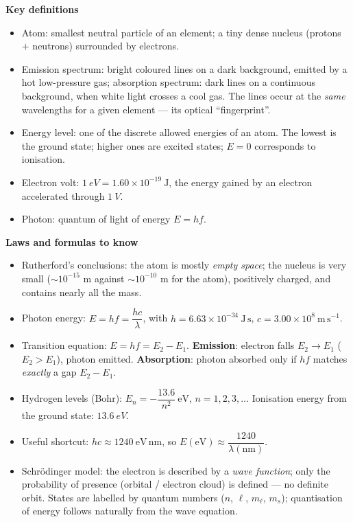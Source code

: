 \documentclass[11pt]{article}
\newcommand{\cle}[1]{{\popxbold\color{popdark}#1}}
\begin{document}
\begin{aretenir}

\textbf{Key definitions}
\begin{itemize}
\item \cle{Atom}: smallest neutral particle of an element; a tiny dense \cle{nucleus} (protons $+$ neutrons) surrounded by electrons.
\item \cle{Emission spectrum}: bright coloured lines on a dark background, emitted by a hot low-pressure gas; \cle{absorption spectrum}: dark lines on a continuous background, when white light crosses a cool gas. The lines occur at the \emph{same} wavelengths for a given element — its optical ``fingerprint''.
\item \cle{Energy level}: one of the discrete allowed energies of an atom. The lowest is the \cle{ground state}; higher ones are \cle{excited states}; $E=0$ corresponds to \cle{ionisation}.
\item \cle{Electron volt}: $\SI{1}{eV} = 1.60\times 10^{-19}\ \mathrm{J}$, the energy gained by an electron accelerated through $\SI{1}{V}$.
\item \cle{Photon}: quantum of light of energy $E=hf$.
\end{itemize}

\textbf{Laws and formulas to know}
\begin{itemize}
\item Rutherford's conclusions: the atom is mostly \emph{empty space}; the nucleus is very small ($\sim 10^{-15}$ m against $\sim 10^{-10}$ m for the atom), positively charged, and contains nearly all the mass.
\item Photon energy: $E = hf = \dfrac{hc}{\lambda}$, with $h = 6.63\times10^{-34}\ \mathrm{J\,s}$, $c = 3.00\times10^{8}\ \mathrm{m\,s^{-1}}$.
\item Transition equation: $\boxed{E = hf = E_2 - E_1}$. \textbf{Emission}: electron falls $E_2 \to E_1$ ($E_2>E_1$), photon emitted. \textbf{Absorption}: photon absorbed only if $hf$ matches \emph{exactly} a gap $E_2-E_1$.
\item Hydrogen levels (Bohr): $E_n = -\dfrac{13.6}{n^2}\ \mathrm{eV}$, $n = 1, 2, 3, \dots$ Ionisation energy from the ground state: $\SI{13.6}{eV}$.
\item Useful shortcut: $hc \approx 1240\ \mathrm{eV\,nm}$, so $E(\mathrm{eV}) \approx \dfrac{1240}{\lambda(\mathrm{nm})}$.
\item Schr\"odinger model: the electron is described by a \emph{wave function}; only the \cle{probability} of presence (orbital / electron cloud) is defined — no definite orbit. States are labelled by quantum numbers ($n$, $\ell$, $m_\ell$, $m_s$); quantisation of energy follows naturally from the wave equation.
\end{itemize}


\end{aretenir}
\end{document}
